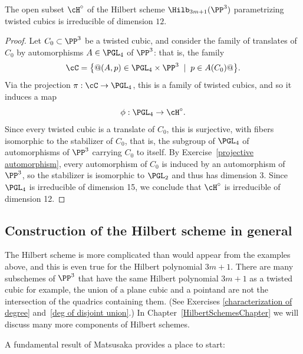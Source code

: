 \begin{proposition}
\label{hilb of twisted cubics}
The open subset $\cH^\circ$ of the Hilbert scheme $\Hilb_{3m+1}(\PP^3)$
para\-metrizing twisted cubics is irreducible of dimension $12$.
\unif
\end{proposition}

\begin{proof}
Let $C_0 \subset \PP^3$ be a twisted cubic, and consider the family
%
of translates of $C_0$ by automorphisms $A \in
\PGL_4
$ of $\PP^3$:
that is, the family
$$
\cC = \bigl\{@(A, p) \in \PGL_4 \times \PP^3 \; \mid \; p \in A(C_0)@\bigr\}.
$$
Via the projection $\pi : \cC \to \PGL_4$, this is a family of twisted
cubics, and so it induces a map
$$
\phi : \PGL_4 \to \cH^\circ.
$$
Since every twisted cubic is a translate of $C_0$, this is surjective,
with fibers isomorphic to the stabilizer of $C_0$, that is, the subgroup
of $\PGL_4$ of automorphisms of $\PP^3$ carrying $C_0$ to itself. By
Exercise~\ref{projective automorphism}, every automorphism of $C_{0}$ is
induced by an automorphism of $\PP^{3}$, so the stabilizer is isomorphic
to $\PGL_2$ and  thus has dimension 3. Since $\PGL_4$ is irreducible of
dimension 15, we conclude that $\cH^\circ$ is irreducible of dimension 12.
\end{proof}

\subsection{Construction of the Hilbert scheme in general}
\label{hilb construction}

The Hilbert scheme is more complicated than would appear from the examples
above, and this is even true
for the Hilbert polynomial $3m+1$. There are many subschemes of $\PP^3$
that have the same Hilbert polynomial $3m+1$ as a twisted cubic\emdash
for example, the union of a plane cubic and a point\emdash and are
not the intersection of the quadrics containing them. (See Exercises
\ref{characterization of degree} and~\ref{deg of disjoint union}.) In
Chapter~\ref{HilbertSchemesChapter} we will discuss many more components
of Hilbert schemes.

A fundamental result of
%
Matsusaka provides a place to start:

